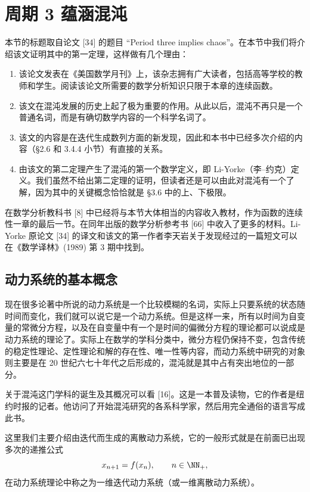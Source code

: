 \section{周期 3 蕴涵混沌}

本节的标题取自论文 [34] 的题目 “Period three implies chaos”。在本节中我们将介绍该文证明其中的第一定理，这样做有几个理由：

\begin{enumerate}
  \item 该论文发表在《美国数学月刊》上，该杂志拥有广大读者，包括高等学校的教师和学生。阅读该论文所需要的数学分析知识只限于本章的连续函数。
  \item 该文在混沌发展的历史上起了极为重要的作用。从此以后，混沌不再只是一个普通名词，而是有确切数学内容的一个科学名词了。
  \item 该文的内容是在迭代生成数列方面的新发现，因此和本书中已经多次介绍的内容（§2.6 和 3.4.4 小节）有直接的关系。
  \item 由该文的第二定理产生了混沌的第一个数学定义，即 Li-Yorke（李--约克）定义。我们虽然不给出第二定理的证明，但读者还是可以由此对混沌有一个了解，因为其中的关键概念恰恰就是 §3.6 中的上、下极限。
\end{enumerate}

在数学分析教科书 [8] 中已经将与本节大体相当的内容收入教材，作为函数的连续性一章的最后一节。在同年出版的数学分析参考书 [66] 中收入了更多的材料。Li-Yorke 原论文 [34] 的译文和该文的第一作者李天岩关于发现经过的一篇短文可以在《数学译林》(1989) 第 3 期中找到。

\subsection{动力系统的基本概念}

现在很多论著中所说的动力系统是一个比较模糊的名词，实际上只要系统的状态随时间而变化，我们就可以说它是一个动力系统。但是这样一来，所有以时间为自变量的常微分方程，以及在自变量中有一个是时间的偏微分方程的理论都可以说成是动力系统的理论了。实际上在数学的学科分类中，微分方程仍保持不变，包含传统的稳定性理论、定性理论和解的存在性、唯一性等内容，而动力系统中研究的对象则主要是在 20 世纪六七十年代之后形成的，混沌就是其中占有突出地位的一部分。

关于混沌这门学科的诞生及其概况可以看 [16]。这是一本普及读物，它的作者是纽约时报的记者。他访问了开始混沌研究的各系科学家，然后用完全通俗的语言写成此书。

这里我们主要介绍由迭代而生成的离散动力系统，它的一般形式就是在前面已出现多次的递推公式
\[
  x_{n+1}=f(x_n),\qquad n\in\NN_+,
\]
在动力系统理论中称之为一维迭代动力系统（或一维离散动力系统）。

